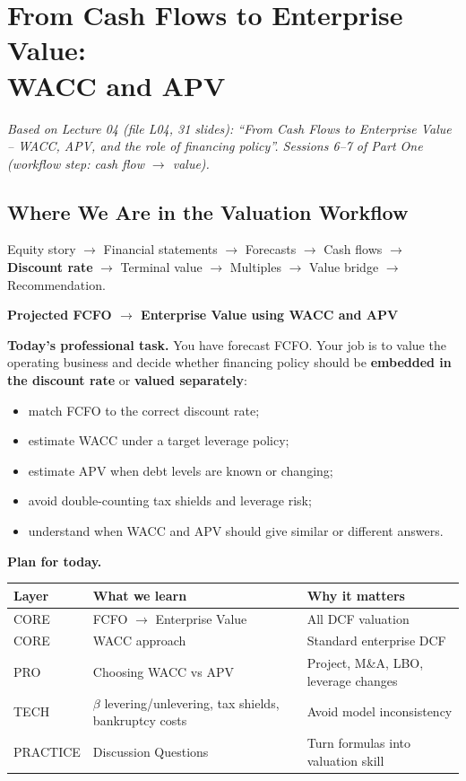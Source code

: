\chapter[From Cash Flows to Enterprise Value: WACC and APV]{From Cash Flows to Enterprise Value:\\WACC and APV}\label{ch:wacc}

\emph{Based on Lecture 04 (file L04, 31 slides): ``From Cash Flows to Enterprise Value -- WACC, APV, and the role of financing policy''. Sessions 6--7 of Part One (workflow step: cash flow $\to$ value).}

\section{Where We Are in the Valuation Workflow}

Equity story $\to$ Financial statements $\to$ Forecasts $\to$ Cash flows $\to$ \textbf{Discount rate} $\to$ Terminal value $\to$ Multiples $\to$ Value bridge $\to$ Recommendation.
\begin{keybox}[Today]
\textbf{Projected FCFO $\longrightarrow$ Enterprise Value using WACC and APV}
\end{keybox}

\textbf{Today's professional task.} You have forecast FCFO. Your job is to value the operating business and decide whether financing policy should be \textbf{embedded in the discount rate} or \textbf{valued separately}:
\begin{itemize}
  \item match FCFO to the correct discount rate;
  \item estimate WACC under a target leverage policy;
  \item estimate APV when debt levels are known or changing;
  \item avoid double-counting tax shields and leverage risk;
  \item understand when WACC and APV should give similar or different answers.
\end{itemize}

\textbf{Plan for today.}
\begin{center}
\small
\begin{tabularx}{\textwidth}{@{}lXX@{}}
\toprule
\textbf{Layer} & \textbf{What we learn} & \textbf{Why it matters}\\
\midrule
CORE & FCFO $\to$ Enterprise Value & All DCF valuation\\
CORE & WACC approach & Standard enterprise DCF\\
PRO & Choosing WACC vs APV & Project, M\&A, LBO, leverage changes\\
TECH & $\beta$ levering/unlevering, tax shields, bankruptcy costs & Avoid model inconsistency\\
PRACTICE & Discussion Questions & Turn formulas into valuation skill\\
\bottomrule
\end{tabularx}
\end{center}

